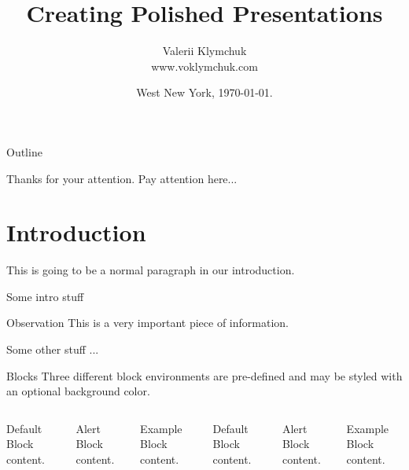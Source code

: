 \documentclass{beamer}
\title{Creating Polished Presentations}
\date{West New York, \today.}
\author{Valerii Klymchuk \\ www.voklymchuk.com}
\institute{Centre for Modern Templates}
\begin{document}
\maketitle



\begin{frame}{Outline}
	\tableofcontents
\end{frame}

\begin{frame}[standout]
	Thanks for your attention.
	Pay attention here...
\end{frame}

\section{Introduction} 

\begin{frame}
	This is going to be a normal paragraph in our introduction.
	
	
		Some intro stuff
		\begin{block}{Observation}
			This is a very important piece of information.
		\end{block}
		Some other stuff ...


\end{frame}





\begin{frame}{Blocks}
	Three different block environments are pre-defined and may be styled with an
	optional background color.
	
	\begin{columns}[T,onlytextwidth]
		\begin{block}{Default}
			Block content.
		\end{block}
		
		\begin{alertblock}{Alert}
			Block content.
		\end{alertblock}
		
		\begin{exampleblock}{Example}
			Block content.
		\end{exampleblock}
		
		
		
		\begin{block}{Default}
			Block content.
		\end{block}
		
		\begin{alertblock}{Alert}
			Block content.
		\end{alertblock}
		
		\begin{exampleblock}{Example}
			Block content.
		\end{exampleblock}
		
	\end{columns}
\end{frame}
\end{document}
